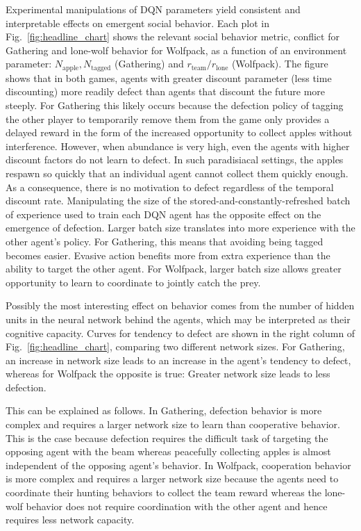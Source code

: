 \documentclass{aamas2017}
\begin{document}
Experimental manipulations of DQN parameters yield consistent and interpretable effects on emergent social behavior. Each plot in Fig.~\ref{fig:headline_chart} shows the relevant social behavior metric, conflict for Gathering and lone-wolf behavior for Wolfpack, as a function of an environment parameter: $N_{\text{apple}},N_{\text{tagged}}$ (Gathering) and $r_{\text{team}}/r_{\text{lone}}$ (Wolfpack). The figure shows that in both games, agents with greater discount parameter (less time discounting) more readily defect than agents that discount the future more steeply. For Gathering this likely occurs because the defection policy of tagging the other player to temporarily remove them from the game only provides a delayed reward in the form of the increased opportunity to collect apples without interference. However, when abundance is very high, even the agents with higher discount factors do not learn to defect. In such paradisiacal settings, the apples respawn so quickly that an individual agent cannot collect them quickly enough. As a consequence, there is no motivation to defect regardless of the temporal discount rate. Manipulating the size of the stored-and-constantly-refreshed batch of experience used to train each DQN agent has the opposite effect on the emergence of defection. Larger batch size translates into more experience with the other agent's policy. For Gathering, this means that avoiding being tagged becomes easier. Evasive action benefits more from extra experience than the ability to target the other agent. For Wolfpack, larger batch size allows greater opportunity to learn to coordinate to jointly catch the prey. 

Possibly the most interesting effect on behavior comes from the number of hidden units in the neural network behind the agents, which may be interpreted as their cognitive capacity. Curves for tendency to defect are shown in the right column of Fig.~\ref{fig:headline_chart}, comparing two different network sizes. For Gathering, an increase in network size leads to an increase in the agent's tendency to defect, whereas for Wolfpack the opposite is true: Greater network size leads to less defection. 

This can be explained as follows. In Gathering, defection behavior is more complex and requires a larger network size to learn than cooperative behavior. This is the case because defection requires the difficult task of targeting the opposing agent with the beam whereas peacefully collecting apples is almost independent of the opposing agent's behavior. In Wolfpack, cooperation behavior is more complex and requires a larger network size because the agents need to coordinate their hunting behaviors to collect the team reward whereas the lone-wolf behavior does not require coordination with the other agent and hence requires less network capacity. 
\end{document}
